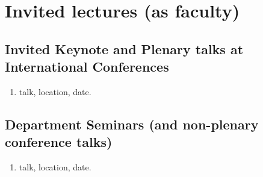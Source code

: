 \chapter{Invited lectures (as faculty)}
\label{talks}

\section{Invited Keynote and Plenary talks at International Conferences}

\begin{enumerate}

     \item talk, location, date.

\end{enumerate}

\section{Department Seminars (and non-plenary conference talks)}

\begin{enumerate}

    \item talk, location, date.
 
\end{enumerate}
